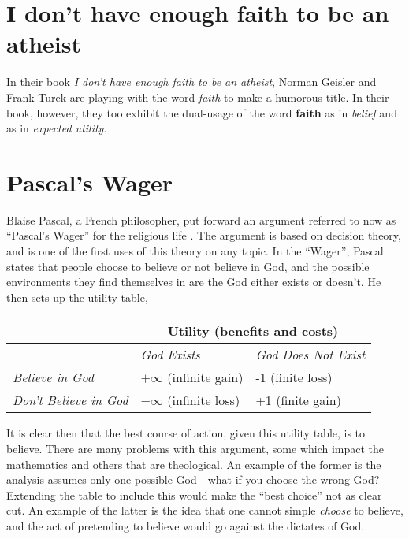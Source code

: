 \section{I don't have enough faith to be an atheist}

In their book {\em I don't have enough faith to be an atheist}\cite{geisler2004don}, Norman Geisler and Frank Turek are playing with the word {\em faith} to make a humorous title.  In their book, however, they too exhibit the dual-usage of the word {\bf faith} as in {\em belief} and as in {\em expected utility}.  


\section{Pascal's Wager}

Blaise Pascal, a French philosopher, put forward an argument referred to now as ``Pascal's Wager''\cite{Wikipedia:2015ac} for the religious life .  The argument is based on decision theory, and is one of the first uses of this theory on any topic.  In the ``Wager'', Pascal states that people choose to believe or not believe in God, and the possible environments they find themselves in are the God either exists or doesn't.  He then sets up the utility table,

\begin{tabular}{@{}lll@{}}
\toprule
 & \multicolumn{2}{c}{\textbf{Utility (benefits and costs)}}  \\ \midrule
 & \textit{God Exists} & \textit{God Does Not Exist}\\
\textit{Believe in God} & $+\infty$ (infinite gain) & -1 (finite loss)   \\
\textit{Don't Believe in God} & $-\infty$ (infinite loss) & +1 (finite gain) \\ \bottomrule
\end{tabular}
\vspace{.1in}

It is clear then that the best course of action, given this utility table, is to believe.  There are many problems with this argument, some which impact the mathematics and others that are theological.  An example of the former is the analysis assumes only one possible God - what if you choose the wrong God?  Extending the table to include this would make the ``best choice'' not as clear cut.  An example of the latter is the idea that one cannot simple {\em choose} to believe, and the act of pretending to believe would go against the dictates of God.  

